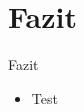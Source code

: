 \section{Fazit}

\begin{frame}{Fazit}
    \begin{itemize}
        \item Test
    \end{itemize}
\end{frame}